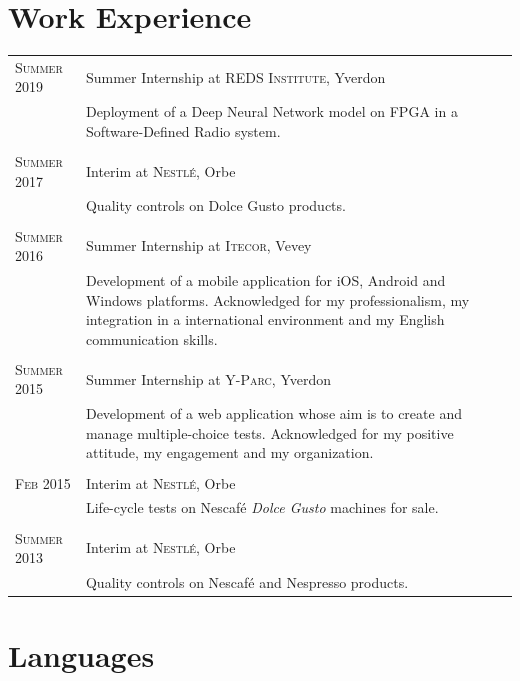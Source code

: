 \documentclass[a4paper,10pt]{article}
\begin{document}
\section{Work Experience}

\begin{tabular}{lp{12cm}}
    \textsc{Summer 2019}
    & Summer Internship at \textsc{REDS Institute}, Yverdon \\
    & \footnotesize{Deployment of a Deep Neural Network model on FPGA in a Software-Defined Radio system.} \\
    \\

    \textsc{Summer 2017}
    & Interim at \textsc{Nestlé}, Orbe \\
    & \footnotesize{Quality controls on Dolce Gusto products.} \\
    \\

    \textsc{Summer 2016}
    & Summer Internship at \textsc{Itecor}, Vevey \\
    \hspace*{2.3cm} & \footnotesize{Development of a mobile application for iOS, Android and Windows platforms. Acknowledged for my professionalism, my integration in a international environment and my English communication skills.} \\
    \\

    \textsc{Summer 2015}
    & Summer Internship at \textsc{Y-Parc}, Yverdon \\
    & \footnotesize{Development of a web application whose aim is to create and manage multiple-choice tests. Acknowledged for my positive attitude, my engagement and my organization.} \\
    \\

    \textsc{Feb 2015} & Interim at \textsc{Nestlé}, Orbe \\
    & \footnotesize{Life-cycle tests on Nescafé \textit{Dolce Gusto} machines for sale.} \\
    \\

    \textsc{Summer 2013} & Interim at \textsc{Nestlé}, Orbe \\
    & \footnotesize{Quality controls on Nescafé and Nespresso products.}
\end{tabular}

\section{Languages}
\end{document}
